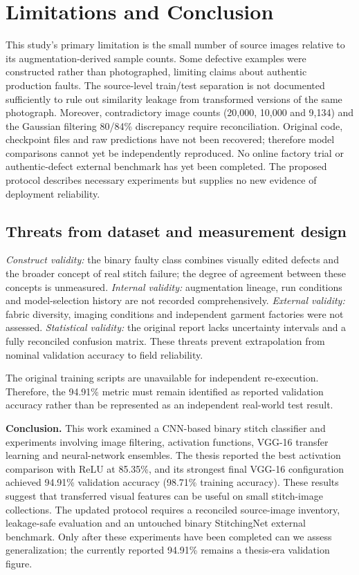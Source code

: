 \documentclass[conference,a4paper]{IEEEtran}
\begin{document}
\section{Limitations and Conclusion}
This study's primary limitation is the small number of source images relative to its augmentation-derived sample counts. Some defective examples were constructed rather than photographed, limiting claims about authentic production faults. The source-level train/test separation is not documented sufficiently to rule out similarity leakage from transformed versions of the same photograph. Moreover, contradictory image counts (20,000, 10,000 and 9,134) and the Gaussian filtering 80/84\% discrepancy require reconciliation. Original code, checkpoint files and raw predictions have not been recovered; therefore model comparisons cannot yet be independently reproduced. No online factory trial or authentic-defect external benchmark has yet been completed. The proposed protocol describes necessary experiments but supplies no new evidence of deployment reliability.

\subsection{Threats from dataset and measurement design}
\textit{Construct validity:} the binary faulty class combines visually edited defects and the broader concept of real stitch failure; the degree of agreement between these concepts is unmeasured. \textit{Internal validity:} augmentation lineage, run conditions and model-selection history are not recorded comprehensively. \textit{External validity:} fabric diversity, imaging conditions and independent garment factories were not assessed. \textit{Statistical validity:} the original report lacks uncertainty intervals and a fully reconciled confusion matrix. These threats prevent extrapolation from nominal validation accuracy to field reliability.

The original training scripts are unavailable for independent re-execution. Therefore, the 94.91\% metric must remain identified as reported validation accuracy rather than be represented as an independent real-world test result.


\noindent\textbf{Conclusion.}
This work examined a CNN-based binary stitch classifier and experiments involving image filtering, activation functions, VGG-16 transfer learning and neural-network ensembles. The thesis reported the best activation comparison with ReLU at 85.35\%, and its strongest final VGG-16 configuration achieved 94.91\% validation accuracy (98.71\% training accuracy). These results suggest that transferred visual features can be useful on small stitch-image collections. The updated protocol requires a reconciled source-image inventory, leakage-safe evaluation and an untouched binary StitchingNet external benchmark. Only after these experiments have been completed can we assess generalization; the currently reported 94.91\% remains a thesis-era validation figure.
\end{document}
